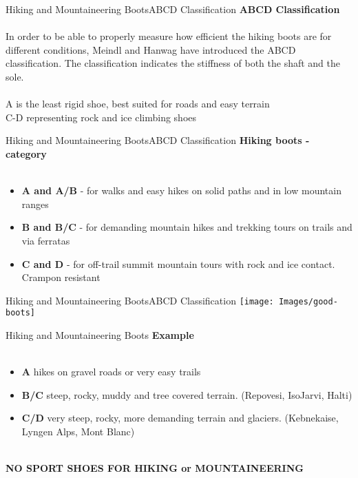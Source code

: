 \documentclass[xcolor=dvipsnames,aspectratio=1610]{beamer}
\begin{document}
\begin{frame}{Hiking and Mountaineering Boots}{ABCD Classification}
\LARGE
\textbf{ABCD Classification}\\~\\
\Large 
In order to be able to properly measure how efficient the hiking boots are 
for different conditions, Meindl and Hanwag have introduced the ABCD 
classification. The classification indicates the stiffness of both the shaft and 
the sole.\\~\\
A is the least rigid shoe, best suited for roads and easy terrain\\
C-D representing rock and ice climbing shoes
\end{frame}


\begin{frame}{Hiking and Mountaineering Boots}{ABCD Classification}
\LARGE
\textbf{Hiking boots - category}\\~\\
\Large
\begin{itemize}
    \item \textbf{A and A/B} - for walks and easy hikes on solid paths and in low mountain ranges
    \item \textbf{B and B/C} - for demanding mountain hikes and trekking tours on trails and via ferratas
    \item \textbf{C and D} - for off-trail summit mountain tours with rock and ice contact. Crampon resistant
\end{itemize}
\end{frame}


\begin{frame}{Hiking and Mountaineering Boots}{ABCD Classification}
\texttt{[image: Images/good-boots]}
\end{frame}

\begin{frame}{Hiking and Mountaineering Boots}{}
\LARGE
\textbf{Example}\\~\\
\Large
\begin{itemize}
    \item \textbf{A} hikes on gravel roads or very easy trails
    \item \textbf{B/C} steep, rocky, muddy and tree covered terrain. (Repovesi, IsoJarvi, Halti)
    \item \textbf{C/D} very steep, rocky, more demanding terrain and glaciers. (Kebnekaise, Lyngen Alps, Mont Blanc)\\~\\
\end{itemize}
\alert{\textbf{NO SPORT SHOES FOR HIKING or MOUNTAINEERING}}
\end{frame}
\end{document}
